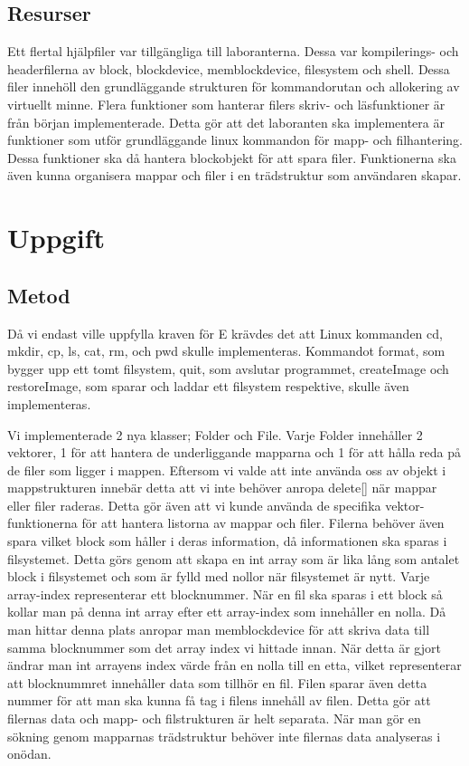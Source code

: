 \documentclass[a4paper,11pt]{article}
\begin{document}
\subsection{Resurser}
Ett flertal hjälpfiler var tillgängliga till laboranterna. Dessa var kompilerings- och headerfilerna av block, blockdevice, memblockdevice, filesystem och shell. Dessa filer innehöll den grundläggande strukturen för kommandorutan och allokering av virtuellt minne. Flera funktioner som hanterar filers skriv- och läsfunktioner är från början implementerade. Detta gör att det laboranten ska implementera är funktioner som utför grundläggande linux kommandon för mapp- och filhantering. Dessa funktioner ska då hantera blockobjekt för att spara filer. Funktionerna ska även kunna organisera mappar och filer i en trädstruktur som användaren skapar.

\section{Uppgift}
\subsection{Metod}
Då vi endast ville uppfylla kraven för E krävdes det att Linux kommanden cd, mkdir, cp, ls, cat, rm, och pwd skulle implementeras. Kommandot format, som bygger upp ett tomt filsystem, quit, som avslutar programmet, createImage och restoreImage, som sparar och laddar ett filsystem respektive, skulle även implementeras.

Vi implementerade 2 nya klasser; Folder och File. Varje Folder innehåller 2 vektorer, 1 för att hantera de underliggande mapparna och 1 för att hålla reda på de filer som ligger i mappen. Eftersom vi valde att inte använda oss av objekt i mappstrukturen innebär detta att vi inte behöver anropa delete[] när mappar eller filer raderas. Detta gör även att vi kunde använda de specifika vektor-funktionerna för att hantera listorna av mappar och filer. Filerna behöver även spara vilket block som håller i deras information, då informationen ska sparas i filsystemet. Detta görs genom att skapa en int array som är lika lång som antalet block i filsystemet och som är fylld med nollor när filsystemet är nytt. Varje array-index representerar ett blocknummer. När en fil ska sparas i ett block så kollar man på denna int array efter ett array-index som innehåller en nolla. Då man hittar denna plats anropar man memblockdevice för att skriva data till samma blocknummer som det array index vi hittade innan. När detta är gjort ändrar man int arrayens index värde från en nolla till en etta, vilket representerar att blocknummret innehåller data som tillhör en fil. Filen sparar även detta nummer för att man ska kunna få tag i filens innehåll av filen. Detta gör att filernas data och mapp- och filstrukturen är helt separata. När man gör en sökning genom mapparnas trädstruktur behöver inte filernas data analyseras i onödan.
\end{document}
